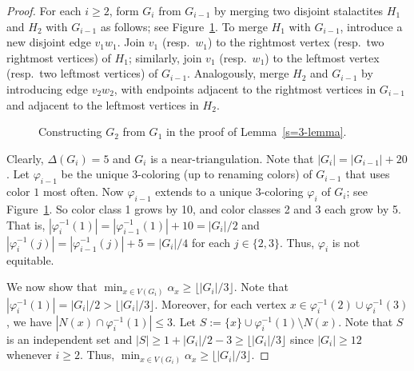 \documentclass[11pt]{article}
\theoremstyle{definition}
\newcommand\floor[1]{\lfloor#1\rfloor}
\renewcommand\ge\geqslant
\renewcommand\le\leqslant
\newcommand{\stalactite}[3]{
\begin{scope}[yscale=.866]
\draw[thick] (#1,0) -- (#1+1,0) -- (#1+2,0) -- (#1+3,0) (#1,0) -- (#1+1.5,1) -- (#1+1,0) (#1+2,0) -- (#1+1.5,1) -- (#1+3,0) (#1,0) -- (#1
+0.5,-1) -- (#1+1,0) -- (#1+1.5,-1) -- (#1+2,0) -- (#1+2.5,-1) -- (#1+3,0);
\foreach \i/\j/\c in {#1+1.5/1/1, #1+0.5/-1/1, #1+1.5/-1/1, #1+2.5/-1/1, #1/0/#2, #1+2/0/#2, #1+1/0/#3, #1+3/0/#3}
\draw[thick] (\i,\j) node[ubStyle] {\tiny{\bf\c}};
\end{scope}
}
\begin{document}
\begin{proof}
For each $i\ge2$, form $G_i$ from $G_{i-1}$ by merging two disjoint stalactites $H_1$ and $H_2$ with $G_{i-1}$ as follows; see Figure~\ref{counterexample2}. 
To merge $H_1$ with $G_{i-1}$, introduce a new disjoint edge $v_1w_1$. Join $v_1$ (resp.~$w_1$) to the rightmost vertex (resp.~two rightmost vertices) 
of $H_1$; similarly, join $v_1$ (resp.~$w_1$) to the leftmost vertex (resp.~two leftmost vertices) of $G_{i-1}$.
Analogously, merge $H_2$ and $G_{i-1}$ by introducing edge $v_2w_2$, with endpoints adjacent to the rightmost vertices in $G_{i-1}$ and adjacent to
the leftmost vertices in $H_2$.
\begin{figure}[!t]
\centering
{}
\caption{Constructing $G_2$ from $G_1$ in the proof of Lemma~\ref{s=3-lemma}.}
\label{counterexample2}
\end{figure}

	Clearly, $\Delta(G_i)=5$ and $G_i$ is a near-triangulation. Note that $|G_i|=|G_{i-1}|+20$. Let $\varphi_{i-1}$ be the unique 3-coloring (up to 
	renaming colors) of $G_{i-1}$ that uses color $1$ most often. Now $\varphi_{i-1}$ extends to a unique 3-coloring $\varphi_i$ of $G_i$; 
	see Figure~\ref{counterexample2}. So color class 1 grows by 10, and color classes 2 and 3 each grow by 5.  That is, 
	$|\varphi_i^{-1}(1)|=|\varphi_{i-1}^{-1}(1)|+10={|G_i|}/{2}$ and 
	$|\varphi_i^{-1}(j)|=|\varphi_{i-1}^{-1}(j)|+5={|G_i|}/{4}$ for each $j\in\{2,3\}$. Thus, $\varphi_i$ is not equitable.

	We now show that $\min_{x\in V(G_i)}\alpha_x\ge\floor{|G_i|/3}$. Note that $|\varphi_i^{-1}(1)|={|G_i|}/{2}>\lfloor{|G_i|}/{3}\rfloor$. 
	Moreover, for each vertex $x\in\varphi_i^{-1}(2)\cup \varphi_i^{-1}(3)$, we have $|N(x)\cap \varphi_i^{-1}(1)|\le3$. 
	Let $S:=\{x\}\cup\varphi_i^{-1}(1)\setminus N(x)$. 
	Note that $S$ is an independent set and $|S|\ge1+{|G_i|}/{2}-3\ge\floor{{|G_i|}/{3}}$ since $|G_i|\ge 12$ whenever $i\ge2$. 
	Thus, $\min_{x\in V(G_i)}\alpha_x\ge\floor{|G_i|/3}$. 
\end{proof}
\end{document}
